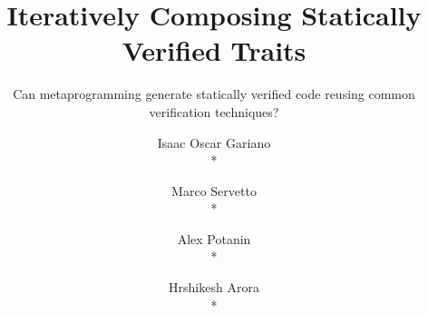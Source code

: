\documentclass[secfooter,english]{beamer}
\title{Iteratively Composing Statically Verified Traits
}
\subtitle{Can metaprogramming generate statically verified
code reusing common verification techniques?}
\author[shortname]{
Isaac Oscar Gariano\inst{1}\\* 
\and
Marco Servetto \inst{1}\\*
\and
Alex Potanin \inst{1}\\*
\and
Hrshikesh Arora \inst{1}\\* 
}
\institute[shortinst]{
\inst{1} Victoria University of Wellington
}
\date{}
\begin{document}
\maketitle
\logo{}

\end{document}

